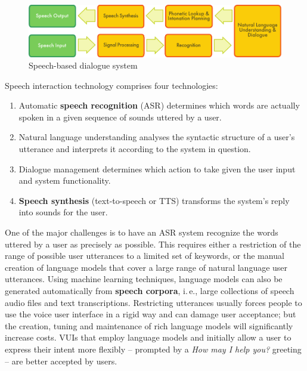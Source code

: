 \documentclass[]{../../metanetpaper}
\begin{document}
\begin{multicols}{2}
\begin{figure}[htb]
  \center
  \includegraphics[width=\textwidth]{../_media/english/simple_speech-based_dialogue_architecture}
  \caption{Speech-based dialogue system}
  \label{fig:dialoguearch_en}
\end{figure}

Speech interaction technology comprises four technologies: 

\begin{enumerate}
\item Automatic \textbf{speech recognition} (ASR) determines which words are actually spoken in a given sequence of sounds uttered by a user.  
\item Natural language understanding analyses the syntactic structure of a user’s utterance and interprets it according to the system in question.
\item Dialogue management determines which action to take given the user input and system functionality.   
\item \textbf{Speech synthesis} (text-to-speech or TTS) transforms the system’s reply into sounds for the user.
\end{enumerate}

One of the major challenges is to have an ASR system recognize the words uttered by a user as precisely as possible. This requires either a restriction of the range of possible user utterances to a limited set of keywords, or the manual creation of language models that cover a large range of natural language user utterances. Using machine learning techniques, language models can also be generated automatically from \textbf{speech corpora}, i.\,e., large collections of speech audio files and text transcriptions. Restricting utterances usually forces people to use the voice user interface in a rigid way and can damage user acceptance; but the creation, tuning and maintenance of rich language models will significantly increase costs. VUIs that employ language models and initially allow a user to express their intent more flexibly -- prompted by a \textit{How may I help you?} greeting -- are better accepted by users.


\end{multicols}
\end{document}
